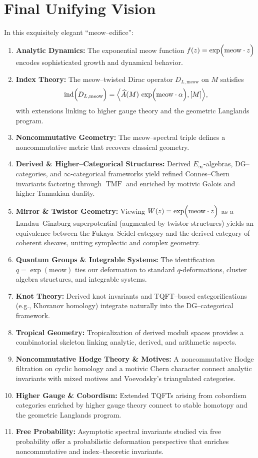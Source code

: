 \documentclass[11pt,a4paper]{article}
\newcommand{\meow}{\mathrm{meow}}
\newcommand{\ind}{\operatorname{ind}}
\newcommand{\TMF}{\operatorname{TMF}}
\theoremstyle{plain}
\theoremstyle{definition}
\theoremstyle{remark}
\begin{document}
\section{Final Unifying Vision}
In this exquisitely elegant ``meow--edifice'':
\begin{enumerate}[label=(\alph*)]
    \item \textbf{Analytic Dynamics:} The exponential meow function \(f(z)=\exp\Bigl(\meow\cdot z\Bigr)\) encodes sophisticated growth and dynamical behavior.
    \item \textbf{Index Theory:} The meow--twisted Dirac operator \(D_{L,\meow}\) on \(M\) satisfies
    \[
        \ind\Bigl(D_{L,\meow}\Bigr)
        = \Bigl\langle \widehat{A}(M)\,\exp\Bigl(\meow\cdot\alpha\Bigr),[M]\Bigr\rangle,
    \]
    with extensions linking to higher gauge theory and the geometric Langlands program.
    \item \textbf{Noncommutative Geometry:} The meow--spectral triple defines a noncommutative metric that recovers classical geometry.
    \item \textbf{Derived \& Higher--Categorical Structures:} Derived \(E_\infty\)-algebras, DG--categories, and \(\infty\)-categorical frameworks yield refined Connes--Chern invariants factoring through \(\TMF\) and enriched by motivic Galois and higher Tannakian duality.
    \item \textbf{Mirror \& Twistor Geometry:} Viewing \(W(z)=\exp\Bigl(\meow\cdot z\Bigr)\) as a Landau--Ginzburg superpotential (augmented by twistor structures) yields an equivalence between the Fukaya--Seidel category and the derived category of coherent sheaves, uniting symplectic and complex geometry.
    \item \textbf{Quantum Groups \& Integrable Systems:} The identification \(q=\exp(\meow)\) ties our deformation to standard \(q\)-deformations, cluster algebra structures, and integrable systems.
    \item \textbf{Knot Theory:} Derived knot invariants and TQFT--based categorifications (e.g., Khovanov homology) integrate naturally into the DG–categorical framework.
    \item \textbf{Tropical Geometry:} Tropicalization of derived moduli spaces provides a combinatorial skeleton linking analytic, derived, and arithmetic aspects.
    \item \textbf{Noncommutative Hodge Theory \& Motives:} A noncommutative Hodge filtration on cyclic homology and a motivic Chern character connect analytic invariants with mixed motives and Voevodsky’s triangulated categories.
    \item \textbf{Higher Gauge \& Cobordism:} Extended TQFTs arising from cobordism categories enriched by higher gauge theory connect to stable homotopy and the geometric Langlands program.
    \item \textbf{Free Probability:} Asymptotic spectral invariants studied via free probability offer a probabilistic deformation perspective that enriches noncommutative and index–theoretic invariants.
\end{enumerate}
\end{document}
